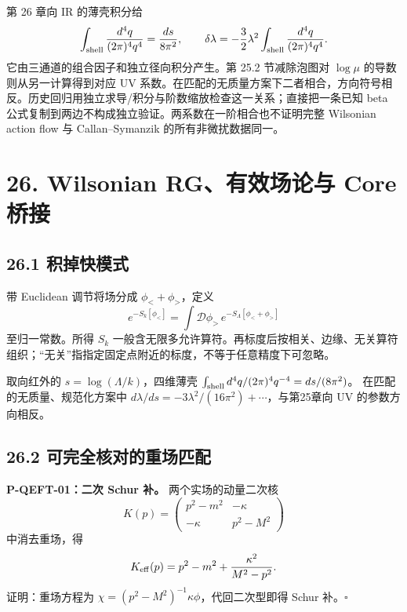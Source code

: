 \documentclass[
  11pt,
  oneside]{book}
\begin{document}
第 26 章向 IR 的薄壳积分给 \[
\int_{\rm shell}\frac{d^4q}{(2\pi)^4q^4}=\frac{ds}{8\pi^2},
\qquad\delta\lambda=-\frac32\lambda^2\int_{\rm shell}\frac{d^4q}{(2\pi)^4q^4}.
\] 它由三通道的组合因子和独立径向积分产生。第 25.2 节减除泡图对
\(\log\mu\) 的导数则从另一计算得到对应 UV
系数。在匹配的无质量方案下二者相合，方向符号相反。历史回归用独立求导/积分与阶数缩放检查这一关系；直接把一条已知
beta 公式复制到两边不构成独立验证。两系数在一阶相合也不证明完整
Wilsonian action flow 与 Callan--Symanzik 的所有非微扰数据同一。

\hypertarget{ch-26}{%
\chapter{26. Wilsonian RG、有效场论与 Core 桥接}\label{ch-26}}

\hypertarget{ux79efux6389ux5febux6a21ux5f0f}{%
\section{26.1 积掉快模式}\label{ux79efux6389ux5febux6a21ux5f0f}}

带 Euclidean 调节将场分成 \(\phi_<+\phi_>\)，定义 \[
e^{-S_k[\phi_<]}=\int\mathcal D\phi_>\,e^{-S_\Lambda[\phi_<+\phi_>]}
\] 至归一常数。所得 \(S_k\)
一般含无限多允许算符。再标度后按相关、边缘、无关算符组织；``无关''指指定固定点附近的标度，不等于任意精度下可忽略。

取向红外的 \(s=\log(\Lambda/k)\)，四维薄壳
\(\int_{\rm shell}d^4q/(2\pi)^4q^{-4}=ds/(8\pi^2)\)。
在匹配的无质量、规范化方案中
\(d\lambda/ds=-3\lambda^2/(16\pi^2)+\cdots\)，与第25章向 UV
的参数方向相反。

\hypertarget{ux53efux5b8cux5168ux6838ux5bf9ux7684ux91cdux573aux5339ux914d}{%
\section{26.2
可完全核对的重场匹配}\label{ux53efux5b8cux5168ux6838ux5bf9ux7684ux91cdux573aux5339ux914d}}

\protect\hypertarget{p-qeft-01}{}{}

\textbf{P-QEFT-01：二次 Schur 补。} 两个实场的动量二次核 \[
K(p)=\begin{pmatrix}p^2-m^2&-\kappa\\-\kappa&p^2-M^2\end{pmatrix}
\] 中消去重场，得 \[
K_{\rm eff}(p)=p^2-m^2+\frac{\kappa^2}{M^2-p^2}.
\] 证明：重场方程为 \(\chi=(p^2-M^2)^{-1}\kappa\phi\)，代回二次型即得
Schur 补。\(\square\)
\end{document}
